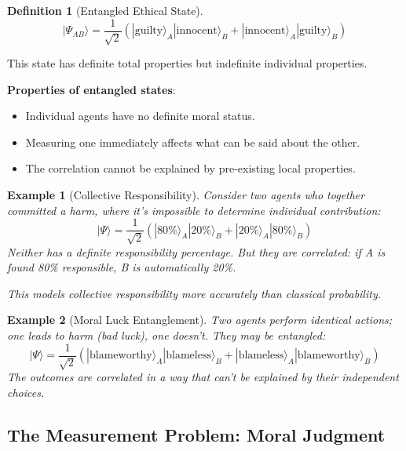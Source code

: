 \documentclass[12pt]{article}
\newtheorem{definition}{Definition}[section]
\newtheorem{example}{Example}[section]
\begin{document}
\begin{definition}[Entangled Ethical State]
\begin{equation}
    |\Psi_{AB}\rangle = \frac{1}{\sqrt{2}} \left( |\text{guilty}\rangle_A |\text{innocent}\rangle_B + |\text{innocent}\rangle_A |\text{guilty}\rangle_B \right)
\end{equation}
\end{definition}

This state has definite total properties but indefinite individual properties.

\textbf{Properties of entangled states}:
\begin{itemize}
    \item Individual agents have no definite moral status.
    \item Measuring one immediately affects what can be said about the other.
    \item The correlation cannot be explained by pre-existing local properties.
\end{itemize}

\begin{example}[Collective Responsibility]
Consider two agents who together committed a harm, where it's impossible to determine individual contribution:
\begin{equation}
    |\Psi\rangle = \frac{1}{\sqrt{2}} \left( |80\%\rangle_A |20\%\rangle_B + |20\%\rangle_A |80\%\rangle_B \right)
\end{equation}
Neither has a definite responsibility percentage. But they are correlated: if A is found 80\% responsible, B is automatically 20\%.

This models collective responsibility more accurately than classical probability.
\end{example}

\begin{example}[Moral Luck Entanglement]
Two agents perform identical actions; one leads to harm (bad luck), one doesn't. They may be entangled:
\begin{equation}
    |\Psi\rangle = \frac{1}{\sqrt{2}} \left( |\text{blameworthy}\rangle_A |\text{blameless}\rangle_B + |\text{blameless}\rangle_A |\text{blameworthy}\rangle_B \right)
\end{equation}
The outcomes are correlated in a way that can't be explained by their independent choices.
\end{example}

\subsection{The Measurement Problem: Moral Judgment}
\end{document}
